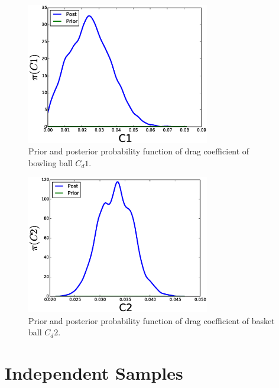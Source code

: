 \documentclass{article}
\begin{document}
\begin{figure}[H]
\begin{centering}
\includegraphics[width=8cm]{figs/C1_post} 
\par\end{centering}

\caption{Prior and posterior probability function of drag coefficient of bowling
ball $C_{d}1$. }




\label{fig:Uc} 
\end{figure}


\begin{figure}[H]
\begin{centering}
\includegraphics[width=8cm]{figs/C2_post} 
\par\end{centering}

\caption{Prior and posterior probability function of drag coefficient of basket
ball $C_{d}2$. }




\label{fig:Uc} 
\end{figure}



\section{Independent Samples}
\end{document}
